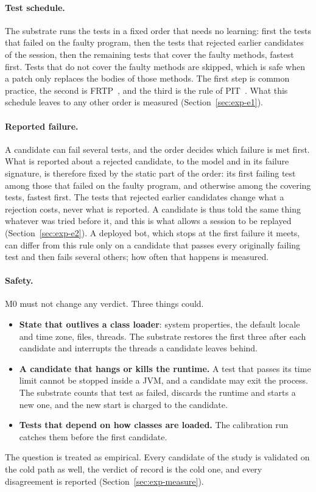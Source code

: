 \paragraph{Test schedule.} The substrate runs the tests in a fixed order that
needs no learning: first the tests that failed on the faulty program, then the
tests that rejected earlier candidates of the session, then the remaining
tests that cover the faulty methods, fastest first. Tests that do not cover
the faulty methods are skipped, which is safe when a patch only replaces the
bodies of those methods. The first step is common practice, the second is
FRTP~\citep{qi2013frtp}, and the third is the rule of
PIT~\citep{coles2016pit}. What this schedule leaves to any other order is
measured (Section~\ref{sec:exp-e1}).

\paragraph{Reported failure.} A candidate can fail several tests, and the
order decides which failure is met first. What is reported about a rejected
candidate, to the model and in its failure signature, is therefore fixed by
the static part of the order: its first failing test among those that failed
on the faulty program, and otherwise among the covering tests, fastest first.
The tests that rejected earlier candidates change what a rejection costs,
never what is reported. A candidate is thus told the same thing whatever was
tried before it, and this is what allows a session to be replayed
(Section~\ref{sec:exp-e2}). A deployed bot, which stops at the first failure
it meets, can differ from this rule only on a candidate that passes every
originally failing test and then fails several others; how often that happens
is measured.

\paragraph{Safety.} M0 must not change any verdict. Three things could.
\begin{itemize}
\item \textbf{State that outlives a class loader}: system properties, the
default locale and time zone, files, threads. The substrate restores the first
three after each candidate and interrupts the threads a candidate leaves
behind.
\item \textbf{A candidate that hangs or kills the runtime.} A test that passes
its time limit cannot be stopped inside a JVM, and a candidate may exit the
process. The substrate counts that test as failed, discards the runtime and
starts a new one, and the new start is charged to the candidate.
\item \textbf{Tests that depend on how classes are loaded.} The calibration
run catches them before the first candidate.
\end{itemize}
The question is treated as empirical. Every candidate of the study is
validated on the cold path as well, the verdict of record is the cold one, and
every disagreement is reported (Section~\ref{sec:exp-measure}).

